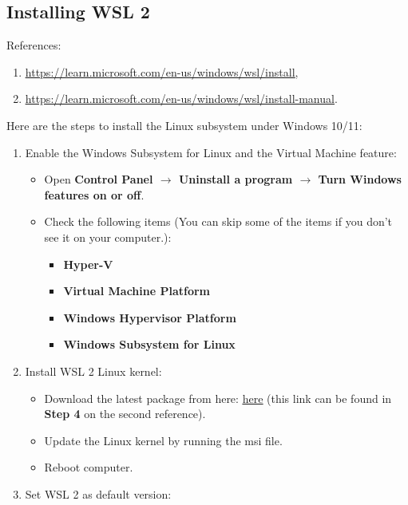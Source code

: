 \subsection{Installing WSL 2}
References: 
\begin{enumerate}
    \item \href{https://learn.microsoft.com/en-us/windows/wsl/install}{\color{blue}\underline{https://learn.microsoft.com/en-us/windows/wsl/install}},
    \item \href{https://learn.microsoft.com/en-us/windows/wsl/install-manual}{\color{blue}\underline{https://learn.microsoft.com/en-us/windows/wsl/install-manual}}.
\end{enumerate}
Here are the steps to install the Linux subsystem under Windows 10/11:
\begin{enumerate}
    \item Enable the Windows Subsystem for Linux and the Virtual Machine feature:
    \begin{itemize}
        \item Open {\bf Control Panel $\rightarrow$ Uninstall a program $\rightarrow$ Turn Windows features on or off}.
        \item Check the following items (You can skip some of the items if you don't see it on your computer.):
        \begin{itemize}
        \item {\bf Hyper-V}
            \item {\bf Virtual Machine Platform}
            \item {\bf Windows Hypervisor Platform}
            \item {\bf Windows Subsystem for Linux}
        \end{itemize}
    \end{itemize}
    \item Install WSL 2 Linux kernel:
    \begin{itemize}
        \item Download the latest package from here: \href{https://wslstorestorage.blob.core.windows.net/wslblob/wsl_update_x64.msi}{\color{blue}\underline{here}} (this link can be found in {\bf Step 4} on the second reference).
        \item Update the Linux kernel by running the msi file.
        \item Reboot computer.
    \end{itemize}
    \item Set WSL 2 as default version:
    \begin{itemize}

\end{itemize}
\end{enumerate}
